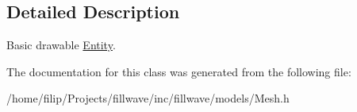 \subsection{Detailed Description}
Basic drawable \hyperlink{classfillwave_1_1models_1_1Entity}{Entity}. 

The documentation for this class was generated from the following file\+:\begin{DoxyCompactItemize}
\item 
/home/filip/\+Projects/fillwave/inc/fillwave/models/Mesh.\+h\end{DoxyCompactItemize}
